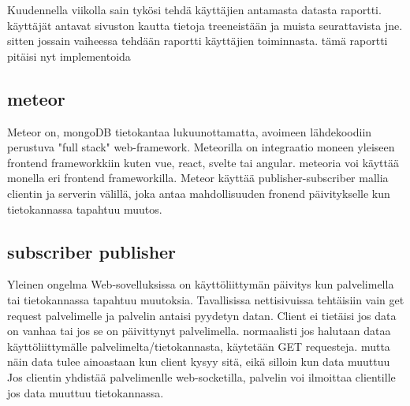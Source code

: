 
Kuudennella viikolla sain tykösi tehdä käyttäjien antamasta datasta raportti.
käyttäjät antavat sivuston kautta tietoja treeneistään ja muista seurattavista jne. sitten jossain vaiheessa tehdään raportti käyttäjien toiminnasta.
tämä raportti pitäisi nyt implementoida


\subsection*{meteor}

Meteor on, mongoDB tietokantaa lukuunottamatta, avoimeen lähdekoodiin perustuva "full stack" web-framework. Meteorilla on integraatio moneen yleiseen frontend frameworkkiin kuten vue, react, svelte tai angular.
meteoria voi käyttää monella eri frontend frameworkilla.
Meteor käyttää publisher-subscriber mallia clientin ja serverin välillä, joka antaa mahdollisuuden fronend päivitykselle kun tietokannassa tapahtuu muutos.



\medskip







\subsection*{subscriber publisher}

Yleinen ongelma Web-sovelluksissa on käyttöliittymän päivitys kun palvelimella tai tietokannassa tapahtuu muutoksia. 
Tavallisissa nettisivuissa tehtäisiin vain get request palvelimelle ja palvelin antaisi pyydetyn datan. Client ei tietäisi jos data on vanhaa tai jos se on päivittynyt palvelimella.
normaalisti jos halutaan dataa käyttöliittymälle palvelimelta/tietokannasta, käytetään GET requesteja. mutta näin data tulee ainoastaan kun client kysyy sitä, eikä silloin kun data muuttuu
Jos clientin yhdistää palvelimenlle web-socketilla, palvelin voi ilmoittaa clientille jos data muuttuu tietokannassa.
\medskip

